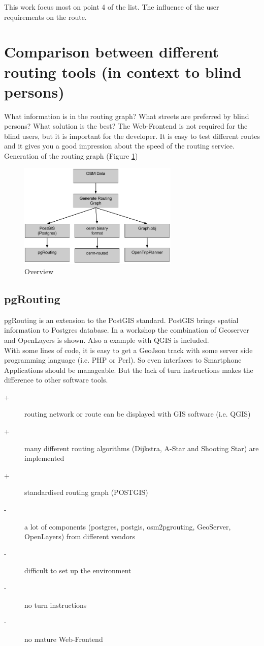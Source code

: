 \documentclass{sig-alternate}
\begin{document}
This work focus most on point 4 of the list. The influence of the user requirements on the route.  

\section{Comparison between different routing tools (in context to blind persons)}

What information is in the routing graph? What streets are preferred by blind persons? What solution is the best?
The Web-Frontend is not required for the blind users, but it is important for the developer. It is easy to test different routes and it gives you a good impression about the speed of the routing service. \\
Generation of the routing graph (Figure \ref{fig:overview})

\begin{figure}
\centering
\includegraphics[width=3in]{Overview2.png}
\caption{Overview}
\label{fig:overview}
\end{figure}

\subsection{pgRouting\cite{pgrouting}}
pgRouting is an extension to the PostGIS standard. PostGIS brings spatial information to Postgres database. 
In a workshop the combination of Geoserver and OpenLayers is shown. Also a example with QGIS is included. \\
With some lines of code, it is easy to get a GeoJson track with  some server side programming language (i.e. PHP or Perl). So even interfaces to Smartphone Applications should be manageable. But the lack of turn instructions makes the difference to other software tools.  

\begin{description}
  \item[+] routing network or route can be displayed with GIS software (i.e. QGIS)
  \item[+] many different routing algorithms (Dijkstra, A-Star and Shooting Star)  are implemented
  \item[+] standardised routing graph (POSTGIS)
  \item[-] a lot of components (postgres, postgis, osm2pgrouting, GeoServer, OpenLayers) from different vendors   
  \item[-] difficult to set up the environment 
  \item[-] no turn instructions
  \item[-] no mature Web-Frontend  
\end{description} 
\end{document}

